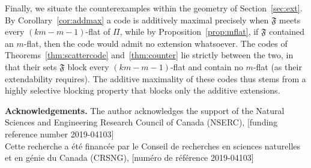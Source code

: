 \documentclass[12pt]{article}
\theoremstyle{definition}
\numberwithin{equation}{section}
\newcommand{\GF}[1]{\mathrm{GF}(#1)}
\newcommand{\PG}[2]{\mathrm{PG}(#1,\,#2)}
\newcommand{\Afold}{\mathfrak{F}}
\begin{document}
Finally, we situate the counterexamples within the geometry of Section~\ref{sec:ext}.  By Corollary~\ref{cor:addmax} a code is additively maximal precisely when $\Afold$ meets every $(km-m-1)$-flat of $\Pi$, while by Proposition~\ref{prop:mflat}, if $\Afold$ contained an $m$-flat, then the code would admit no extension whatsoever.  The codes of Theorems~\ref{thm:scattercode} and~\ref{thm:counter} lie strictly between the two, in that their sets $\Afold$ block every $(km-m-1)$-flat and contain no $m$-flat (as their extendability requires).  
The additive maximality of these codes thus stems from a highly selective blocking property that blocks only the additive extensions.


\bigskip
\noindent\textbf{Acknowledgements.}
 The author acknowledges the support of the Natural Sciences and Engineering Research Council of Canada (NSERC), [funding reference number 2019-04103]\\
Cette recherche a \'{e}t\'{e} financ\'{e}e par le Conseil de recherches en sciences naturelles et en g\'{e}nie du Canada (CRSNG), [num\'{e}ro de r\'{e}f\'{e}rence 2019-04103]



\end{document}
